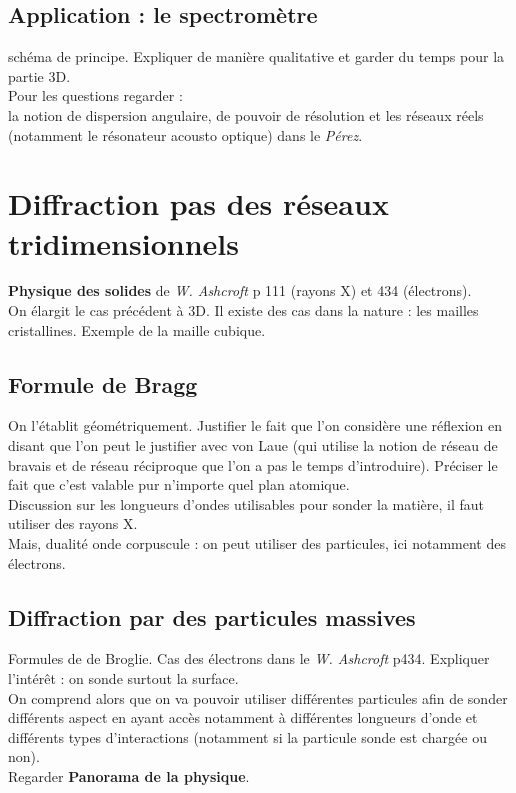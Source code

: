 \documentclass[12pt,prb,aps,epsf]{article}
\begin{document}
\subsection{Application : le spectromètre}
schéma de principe. Expliquer de manière qualitative et garder du temps pour la partie 3D.\\

Pour les questions regarder :\\
la notion de dispersion angulaire, de pouvoir de résolution et les réseaux réels (notamment le résonateur acousto optique) dans le \textit{Pérez}.

\section{Diffraction pas des réseaux tridimensionnels}
\textbf{Physique des solides} de \textit{W. Ashcroft} p 111 (rayons X) et 434 (électrons).\\

On élargit le cas précédent à 3D. Il existe des cas dans la nature : les mailles cristallines. Exemple de la maille cubique.

\subsection{Formule de Bragg}
On l'établit géométriquement. Justifier le fait que l'on considère une réflexion en disant que l'on peut le justifier avec von Laue (qui utilise la notion de réseau de bravais et de réseau réciproque que l'on a pas le temps d'introduire). Préciser le fait que c'est valable pur n'importe quel plan atomique.\\ 
Discussion sur les longueurs d'ondes utilisables pour sonder la matière, il faut utiliser des rayons X.\\

 Mais, dualité onde corpuscule : on peut utiliser des particules, ici notamment des électrons.

\subsection{Diffraction par des particules massives}
Formules de de Broglie. Cas des électrons dans le \textit{W. Ashcroft} p434. Expliquer l'intérêt : on sonde surtout la surface.\\
On comprend alors que on va pouvoir utiliser différentes particules afin de sonder différents aspect en ayant accès notamment à différentes longueurs d'onde et différents types d'interactions (notamment si la particule sonde est chargée ou non). \\
Regarder \textbf{Panorama de la physique}.
\end{document}
